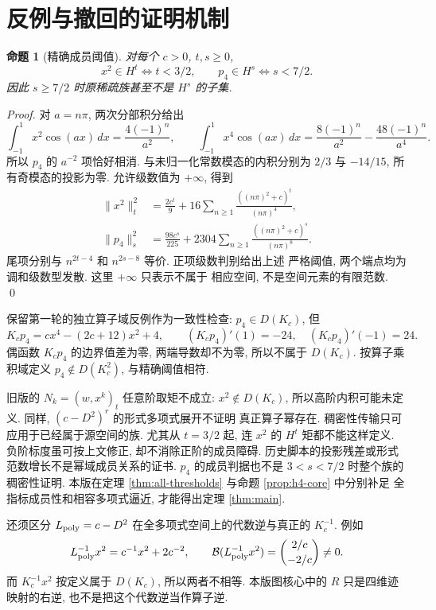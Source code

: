 \documentclass[UTF8]{ctexart}
\newtheorem{proposition}[theorem]{命题}
\begin{document}
\section{反例与撤回的证明机制}
\begin{proposition}[精确成员阈值]\label{prop:thresholds}
对每个 $c>0$, $t,s\ge0$,
\[
 x^2\in H^t\iff t<3/2,\qquad p_4\in H^s\iff s<7/2.
\]
因此 $s\ge7/2$ 时原稀疏族甚至不是 $H^s$ 的子集.
\end{proposition}
\begin{proof}
对 $a=n\pi$, 两次分部积分给出
\[
 \int_{-1}^1x^2\cos(ax)\,dx=\frac{4(-1)^n}{a^2},\qquad
 \int_{-1}^1x^4\cos(ax)\,dx
 =\frac{8(-1)^n}{a^2}-\frac{48(-1)^n}{a^4}.
\]
所以 $p_4$ 的 $a^{-2}$ 项恰好相消. 与未归一化常数模态的内积分别为 $2/3$ 与
$-14/15$, 所有奇模态的投影为零. 允许级数值为 $+\infty$, 得到
\begin{align*}
 \|x^2\|_t^2&=\frac{2c^t}{9}
 +16\sum_{n\ge1}\frac{((n\pi)^2+c)^t}{(n\pi)^4},\\
 \|p_4\|_s^2&=\frac{98c^s}{225}
 +2304\sum_{n\ge1}\frac{((n\pi)^2+c)^s}{(n\pi)^8}.
\end{align*}
尾项分别与 $n^{2t-4}$ 和 $n^{2s-8}$ 等价. 正项级数判别给出上述
严格阈值, 两个端点均为调和级数型发散. 这里 $+\infty$ 只表示不属于
相应空间, 不是空间元素的有限范数. \qed
\end{proof}

保留第一轮的独立算子域反例作为一致性检查:
$p_4\in D(K_c)$, 但
\[
 K_cp_4=cx^4-(2c+12)x^2+4,\qquad (K_cp_4)'(1)=-24,\quad
 (K_cp_4)'(-1)=24.
\]
偶函数 $K_cp_4$ 的边界值差为零, 两端导数却不为零, 所以不属于 $D(K_c)$.
按算子乘积域定义 $p_4\notin D(K_c^2)$, 与精确阈值相符.

旧版的 $N_k=(w,x^k)_t$ 任意阶取矩不成立: $x^2\notin D(K_c)$,
所以高阶内积可能未定义. 同样, $(c-D^2)^r$ 的形式多项式展开不证明
真正算子幂存在. 稠密性传输只可应用于已经属于源空间的族.
尤其从 $t=3/2$ 起, 连 $x^2$ 的 $H^t$ 矩都不能这样定义.
负阶标度虽可按上文修正, 却不消除正阶的成员障碍.
历史脚本的投影残差或形式范数增长不是幂域成员关系的证书.
$p_4$ 的成员判据也不是 $3<s<7/2$ 时整个族的稠密性证明.
本版在定理 \ref{thm:all-thresholds} 与命题 \ref{prop:h4-core} 中分别补足
全指标成员性和相容多项式逼近, 才能得出定理 \ref{thm:main}.

还须区分 $L_{\rm poly}=c-D^2$ 在全多项式空间上的代数逆与真正的 $K_c^{-1}$.
例如
\[
 L_{\rm poly}^{-1}x^2=c^{-1}x^2+2c^{-2},\qquad
 \mathcal B(L_{\rm poly}^{-1}x^2)=\binom{2/c}{-2/c}\ne0.
\]
而 $K_c^{-1}x^2$ 按定义属于 $D(K_c)$, 所以两者不相等.
本版图核心中的 $R$ 只是四维迹映射的右逆, 也不是把这个代数逆当作算子逆.
\end{document}
